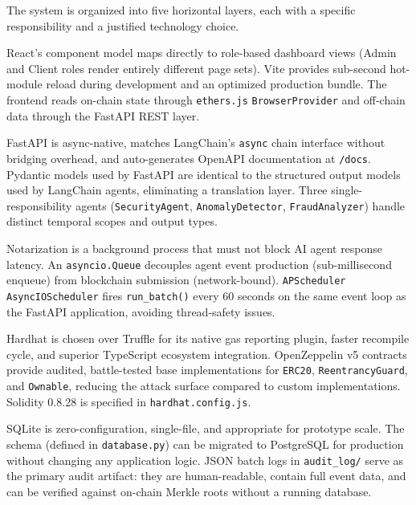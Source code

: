 \documentclass[12pt,a4paper]{article}
\begin{document}
The system is organized into five horizontal layers, each with a specific
responsibility and a justified technology choice.

\begin{description}[leftmargin=2em]
  \item[\textbf{Layer 1 --- Frontend (React + Vite):}]
  React's component model maps directly to role-based dashboard views
  (Admin and Client roles render entirely different page sets). Vite
  provides sub-second hot-module reload during development and an
  optimized production bundle. The frontend reads on-chain state through
  \texttt{ethers.js} \texttt{BrowserProvider} and off-chain data through
  the FastAPI REST layer.

  \item[\textbf{Layer 2 --- Backend AI/API (FastAPI + Agents):}]
  FastAPI is async-native, matches LangChain's \texttt{async} chain
  interface without bridging overhead, and auto-generates OpenAPI
  documentation at \texttt{/docs}. Pydantic models used by FastAPI are
  identical to the structured output models used by LangChain agents,
  eliminating a translation layer. Three single-responsibility agents
  (\texttt{SecurityAgent}, \texttt{AnomalyDetector}, \texttt{FraudAnalyzer})
  handle distinct temporal scopes and output types.

  \item[\textbf{Layer 3 --- Integrity/Notarization (notarizer.py):}]
  Notarization is a background process that must not block AI agent
  response latency. An \texttt{asyncio.Queue} decouples agent event
  production (sub-millisecond enqueue) from blockchain submission
  (network-bound). \texttt{APScheduler AsyncIOScheduler} fires
  \texttt{run\_batch()} every 60 seconds on the same event loop as the
  FastAPI application, avoiding thread-safety issues.

  \item[\textbf{Layer 4 --- Blockchain (Hardhat + Solidity + OpenZeppelin):}]
  Hardhat is chosen over Truffle for its native gas reporting plugin,
  faster recompile cycle, and superior TypeScript ecosystem integration.
  OpenZeppelin v5 contracts provide audited, battle-tested base
  implementations for \texttt{ERC20}, \texttt{ReentrancyGuard}, and
  \texttt{Ownable}, reducing the attack surface compared to custom
  implementations. Solidity 0.8.28 is specified in \texttt{hardhat.config.js}.

  \item[\textbf{Layer 5 --- Persistence (SQLite + JSON batch logs):}]
  SQLite is zero-configuration, single-file, and appropriate for
  prototype scale. The schema (defined in \texttt{database.py}) can be
  migrated to PostgreSQL for production without changing any application
  logic. JSON batch logs in \texttt{audit\_log/} serve as the primary
  audit artifact: they are human-readable, contain full event data, and
  can be verified against on-chain Merkle roots without a running database.
\end{description}
\end{document}
